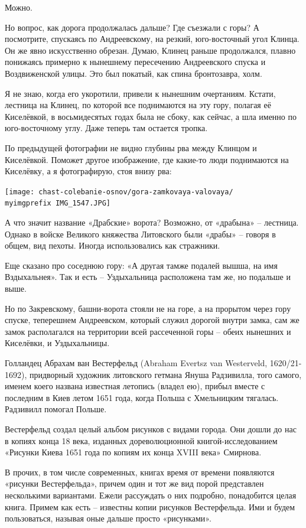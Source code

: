 Можно.

Но вопрос, как дорога продолжалась дальше? Где съезжали с горы? А посмотрите, спускаясь по Андреевскому, на резкий, юго-восточный угол Клинца. Он же явно искусственно обрезан. Думаю, Клинец раньше продолжался, плавно понижаясь примерно к нынешнему пересечению Андреевского спуска и Воздвиженской улицы. Это был покатый, как спина бронтозавра, холм.

Я не знаю, когда его укоротили, привели к нынешним очертаниям. Кстати, лестница на Клинец, по которой все поднимаются на эту гору, полагая её Киселёвкой, в восьмидесятых годах была не сбоку, как сейчас, а шла именно по юго-восточному углу. Даже теперь там остается тропка.

По предыдущей фотографии не видно глубины рва между Клинцом и Киселёвкой. Поможет другое изображение, где какие-то люди поднимаются на Киселёвку, а я фотографирую, стоя внизу рва:

\begin{center}
\texttt{[image: chast-colebanie-osnov/gora-zamkovaya-valovaya/\\myimgprefix IMG\_1547.JPG]}
\end{center}

А что значит название «Драбские» ворота? Возможно, от «драбына» – лестница. Однако в войске Великого княжества Литовского были «драбы» – говоря в общем, вид пехоты. Иногда использовались как стражники.

Еще сказано про соседнюю гору: «А другая тамже подалей вышша, на имя Вздыхальнея». Так и есть – Уздыхальница расположена там же, но подальше и выше.

Но по Закревскому, башни-ворота стояли не на горе, а на прорытом через гору спуске, теперешнем Андреевском, который служил дорогой внутри замка, сам же замок располагался на территории всей рассеченной горы – обеих нынешних и Киселёвки, и Уздыхальницы.

Голландец Абрахам ван Вестерфельд (Abraham Evertsz van Westerveld, 1620/21-1692), придворный художник литовского гетмана Януша Радзивилла, того самого, именем коего названа известная летопись (владел ею), прибыл вместе с последним в Киев летом 1651 года, когда Польша с Хмельницким тягалась. Радзивилл помогал Польше.

Вестерфельд создал целый альбом рисунков с видами города. Они дошли до нас в копиях конца 18 века, изданных дореволюционной книгой-исследованием «Рисунки Киева 1651 года по копиям их конца XVIII века» Смирнова.

В прочих, в том числе современных, книгах время от времени появляются «рисунки Вестерфельда», причем один и тот же вид порой представлен несколькими вариантами. Ежели рассуждать о них подробно, понадобится целая книга. Примем как есть – известны копии рисунков Вестерфельда. Ими и будем пользоваться, называя оные дальше просто «рисунками».

